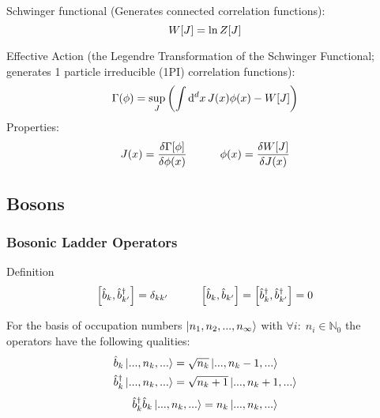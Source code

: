 			\noindent
			Schwinger functional (Generates connected correlation functions):
			\begin{equation}
				W\qty[J] = \ln Z\qty[J]
			\end{equation}

			\noindent
			Effective Action (\ie the Legendre Transformation of the Schwinger Functional; generates 1 particle irreducible (1PI) correlation functions):
			\begin{equation}
				\Gamma(\phi) = \sup_{J} \qty( \int \dd^d x \, J(x) \phi(x) - W[J])
			\end{equation}
			Properties:
			\begin{equation}
				J(x)=\fdv{\Gamma\qty[\phi]}{\phi(x)}
				\hsp \phi(x) = \fdv{W\qty[J]}{J(x)}
			\end{equation}


	\subsection{Bosons}
		\subsubsection{Bosonic Ladder Operators}
		\label{Sec:BosonicCreationAndAnnihilationOperators}
			Definition
			\begin{equation}
				\comm{\hat{b}_k}{\hat{b}_{k'}^\dagger} = \delta_{kk'}
				\hsp
				\comm{\hat{b}_k}{\hat{b}_{k'}} = \comm{\hat{b}_k^\dagger}{\hat{b}_{k'}^\dagger} = 0
			\end{equation}

			\noindent
			For the basis of occupation numbers $\Ket{n_1, n_2, ..., n_\infty}$ with $\forall i:\;n_i\in \mathbb{N}_0$ the operators have the following qualities:
			\begin{equation}
				\begin{aligned}
					\hat{b}_k \Ket{...,n_k,...} &= \sqrt{n_k} \Ket{...,n_k-1,...} \\
					\hat{b}_k^\dagger \Ket{...,n_k,...} &= \sqrt{n_k+1} \Ket{...,n_k+1,...} \\
				\end{aligned}
			\end{equation}
			\begin{equation}
				\hat{b}_k^\dagger \hat{b}_k \Ket{...,n_k,...} = n_k \Ket{...,n_k,...}
			\end{equation}


